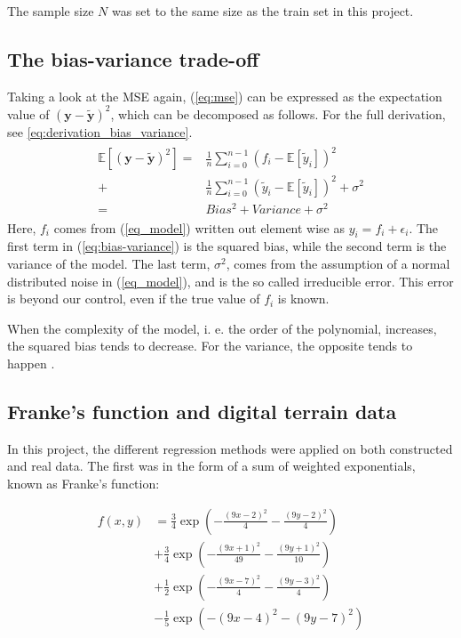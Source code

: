 The sample size $N$ was set to the same size as the train set in this project. 

\subsection{The bias-variance trade-off}
Taking a look at the MSE again, (\ref{eq:mse}) can be expressed as the expectation value of $\left(\boldsymbol{y}-\boldsymbol{\tilde{y}}\right)^2$, which can be decomposed as follows. For the full derivation, see \eqref{eq:derivation_bias_variance}.
\begin{align}\label{eq:bias-variance}
\begin{split}
	\mathds{E}\left[\left(\boldsymbol{y}-\boldsymbol{\tilde{y}}\right)^2\right]
	=&\frac{1}{n}\sum_{i=0}^{n-1}\left(f_i-\mathds{E}\left[{\tilde{y}_i}\right]\right)^2 \\
	+&\frac{1}{n}\sum_{i=0}^{n-1}\left(\tilde{y}_i-\mathds{E}\left[{\tilde{y}_i}\right]\right)^2 + \sigma^2 \\
	=& Bias^2 + Variance + \sigma^2
\end{split}
\end{align}
Here, $f_i$ comes from (\ref{eq_model}) written out element wise as $y_i = f_i + \epsilon_i$. The first term in (\ref{eq:bias-variance}) is the squared bias, while the second term is the variance of the model. The last term, $\sigma^2$, comes from the assumption of a normal distributed noise in (\ref{eq_model}), and is the so called irreducible error. This error is beyond our control, even if the true value of $f_i$ is known.

When the complexity of the model, i. e. the order of the polynomial, increases, the squared bias tends to decrease. For the variance, the opposite tends to happen \citep{hastie2009elements}.

\subsection{Franke's function and digital terrain data}
In this project, the different regression methods were applied on both constructed and real data. The first was in the form of a sum of weighted exponentials, known as Franke's function:

\begin{align*}
	f\left(x,y\right) &=\frac{3}{4}\exp\left(-\frac{\left(9x-2\right)^2}{4}-\frac{\left(9y-2\right)^2}{4} \right) \\
	&+\frac{3}{4}\exp\left(-\frac{\left(9x+1\right)^2}{49}-\frac{\left(9y+1\right)^2}{10} \right) \\
	&+\frac{1}{2}\exp\left(-\frac{\left(9x-7\right)^2}{4}-\frac{\left(9y-3\right)^2}{4} \right) \\
	&-\frac{1}{5}\exp\left(-\left(9x-4\right)^2-\left(9y-7\right)^2 \right)
\end{align*}

